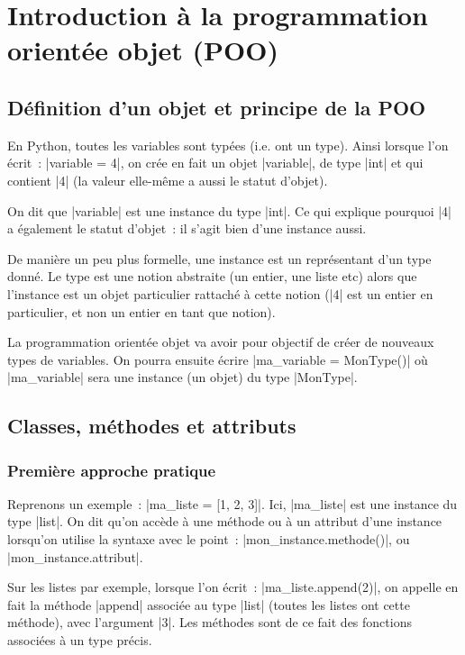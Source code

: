 \section{Introduction à la programmation orientée objet (POO)}

	\subsection{Définition d'un objet et principe de la POO}
	
		En Python, toutes les variables sont typées (i.e. ont un type). Ainsi lorsque l'on écrit~: \python|variable = 4|, on crée en fait un objet \python|variable|, de type \python|int| et qui contient \python|4| (la valeur elle-même a aussi le statut d'objet).
		
		On dit que \python|variable| est une instance du type \python|int|. Ce qui explique pourquoi \python|4| a également le statut d'objet~: il s'agit bien d'une instance aussi.
		
		De manière un peu plus formelle, une instance est un représentant d'un type donné. Le type est une notion abstraite (un entier, une liste etc) alors que l'instance est un objet particulier rattaché à cette notion (\python|4| est un entier en particulier, et non un entier en tant que notion).
			
		La programmation orientée objet va avoir pour objectif de créer de nouveaux types de variables. On pourra ensuite écrire \python|ma_variable = MonType()| où \python|ma_variable| sera une instance (un objet) du type \python|MonType|.
	
	\subsection{Classes, méthodes et attributs}
		
		\subsubsection{Première approche pratique}
		Reprenons un exemple~: \python|ma_liste = [1, 2, 3]|. Ici, \python|ma_liste| est une instance du type \python|list|. On dit qu'on accède à une méthode ou à un attribut d'une instance lorsqu'on utilise la syntaxe avec le point~: \python|mon_instance.methode()|, ou \python|mon_instance.attribut|.
		
		Sur les listes par exemple, lorsque l'on écrit~: \python|ma_liste.append(2)|, on appelle en fait la méthode \python|append| associée au type \python|list| (toutes les listes ont cette méthode), avec l'argument \python|3|. Les méthodes sont de ce fait des fonctions associées à un type précis.
		
